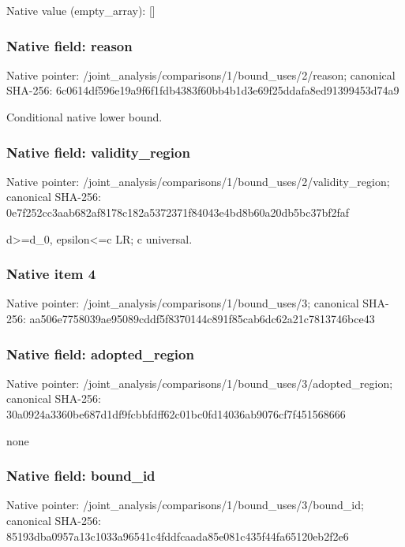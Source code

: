 \documentclass[10pt,a4paper]{article}
\begin{document}
Native value (empty\_\allowbreak{}array): []

\subsubsection{Native field: reason}
Native pointer: /joint\_\allowbreak{}analysis/comparisons/1/bound\_\allowbreak{}uses/2/reason; canonical SHA-256: 6c0614df596e19a9f6f1fdb4383f60bb4b1d3e69f25ddafa8ed91399453d74a9

\begingroup\raggedright\sloppy Conditional native lower bound.\par\endgroup

\subsubsection{Native field: validity\_\allowbreak{}region}
Native pointer: /joint\_\allowbreak{}analysis/comparisons/1/bound\_\allowbreak{}uses/2/validity\_\allowbreak{}region; canonical SHA-256: 0e7f252cc3aab682af8178c182a5372371f84043e4bd8b60a20db5bc37bf2faf

\begingroup\raggedright\sloppy d>=\allowbreak{}d\_\allowbreak{}0,\allowbreak{} epsilon<=\allowbreak{}c LR;\allowbreak{} c universal.\par\endgroup

\subsubsection{Native item 4}
Native pointer: /joint\_\allowbreak{}analysis/comparisons/1/bound\_\allowbreak{}uses/3; canonical SHA-256: aa506e7758039ae95089cddf5f8370144c891f85cab6dc62a21c7813746bce43

\subsubsection{Native field: adopted\_\allowbreak{}region}
Native pointer: /joint\_\allowbreak{}analysis/comparisons/1/bound\_\allowbreak{}uses/3/adopted\_\allowbreak{}region; canonical SHA-256: 30a0924a3360be687d1df9fcbbfdff62c01bc0fd14036ab9076cf7f451568666

\begingroup\raggedright\sloppy none\par\endgroup

\subsubsection{Native field: bound\_\allowbreak{}id}
Native pointer: /joint\_\allowbreak{}analysis/comparisons/1/bound\_\allowbreak{}uses/3/bound\_\allowbreak{}id; canonical SHA-256: 85193dba0957a13c1033a96541c4fddfcaada85e081c435f44fa65120eb2f2e6
\end{document}
